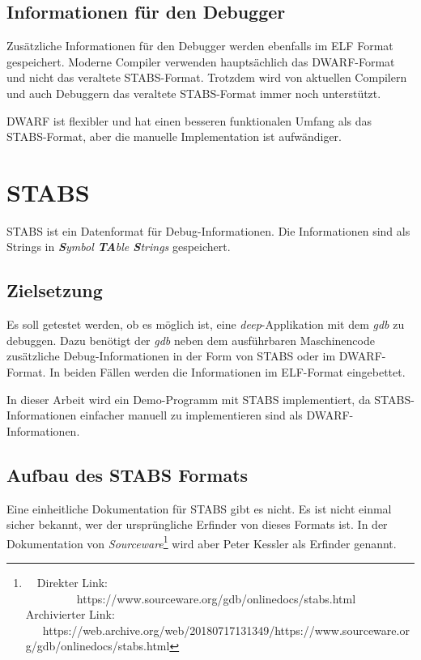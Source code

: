 \subsection{Informationen für den Debugger}
Zusätzliche Informationen für den Debugger werden ebenfalls im ELF Format gespeichert.
Moderne Compiler verwenden hauptsächlich das DWARF-Format und nicht das veraltete STABS-Format.
Trotzdem wird von aktuellen Compilern und auch Debuggern das veraltete STABS-Format immer noch unterstützt.

DWARF ist flexibler und hat einen besseren funktionalen Umfang als das STABS-Format, aber die manuelle Implementation ist aufwändiger.





\section{STABS}
\label{label:stabs}
STABS ist ein Datenformat für Debug-Informationen.
Die Informationen sind als Strings in \textit{\textbf{S}ymbol \textbf{TA}ble \textbf{S}trings} gespeichert.

\subsection{Zielsetzung}
Es soll getestet werden, ob es möglich ist, eine \textit{deep}-Applikation mit dem \textit{gdb} zu debuggen.
Dazu benötigt der \textit{gdb} neben dem ausführbaren Maschinencode zusätzliche Debug-Informationen in der Form von STABS oder im DWARF-Format.
In beiden Fällen werden die Informationen im ELF-Format eingebettet.

In dieser Arbeit wird ein Demo-Programm mit STABS implementiert, da STABS-Informationen einfacher manuell zu implementieren sind als DWARF-Informationen.


\subsection{Aufbau des STABS Formats}
Eine einheitliche Dokumentation für STABS gibt es nicht.
Es ist nicht einmal sicher bekannt, wer der ursprüngliche Erfinder von dieses Formats ist.
In der Dokumentation von \textit{Sourceware}\footnote{\ \ Direkter Link: \ \ \ \ \ \ \ \ \ https://www.sourceware.org/gdb/onlinedocs/stabs.html\\ Archivierter Link: \ \ \ https://web.archive.org/web/20180717131349/https://www.sourceware.org/gdb/onlinedocs/stabs.html} wird aber Peter Kessler als Erfinder genannt.

